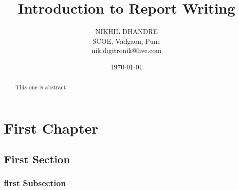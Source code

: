 \documentclass[12pt]{report}
\title{Introduction to Report Writing}
\author{NIKHIL DHANDRE \\ SCOE, Vadgaon, Pune \\ nik.digitronik@live.com }
\date{\today}
\begin{document}
\maketitle
\begin{abstract}
 This one is abstract
\end{abstract}

\tableofcontents
\listoffigures
\listoftables

\chapter{First Chapter}
\section{First Section}
\subsection{first Subsection}
\appendix
\end{document}
